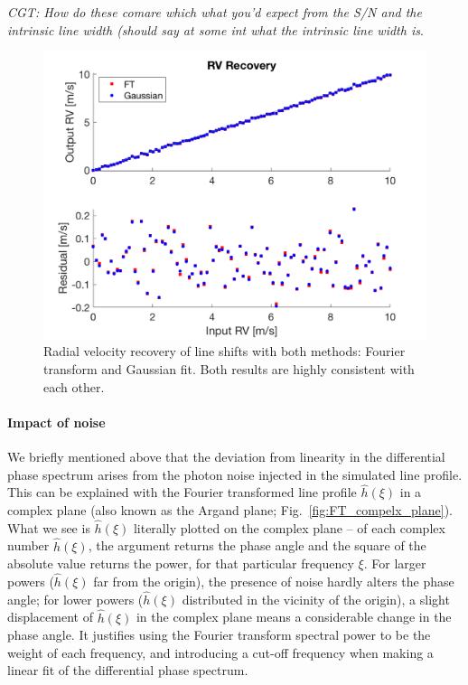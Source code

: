 {\em CGT: How do these comare which what you'd expect from the S/N and the intrinsic line width (should say at some int what the intrinsic line width is}.

\begin{figure}[tbp]
\centering
\includegraphics[width = 0.7 \linewidth]
{./Figures/Methods/5-LINE_SHIFT_ONLY.png}
\caption[Radial velocity recovery]
{Radial velocity recovery of line shifts with both methods: Fourier transform and Gaussian fit. Both results are highly consistent with each other.}
\label{fig:rv_recovery}
\end{figure} 

\paragraph{Impact of noise}
We briefly mentioned above that the deviation from linearity in the differential phase spectrum arises from the photon noise  injected in the simulated line profile. This can be explained with the Fourier transformed line profile $\hat{h}(\xi)$ in a complex plane (also known as the Argand plane; Fig.~\ref{fig:FT_compelx_plane}). What we see is $\hat{h}(\xi)$ literally plotted on the complex plane -- of each complex number $\hat{h}(\xi)$, the argument returns the phase angle and the square of the absolute value returns the power, for that particular frequency $\xi$. For larger powers ($\hat{h}(\xi)$ far from the origin), the presence of noise hardly alters the phase angle; for lower powers ($\hat{h}(\xi)$ distributed in the vicinity of the origin), a slight displacement of $\hat{h}(\xi)$ in the complex plane means a considerable change in the phase angle. It justifies using the Fourier transform spectral power to be the weight of each frequency, and introducing a cut-off frequency when making a linear fit of the differential phase spectrum. 

